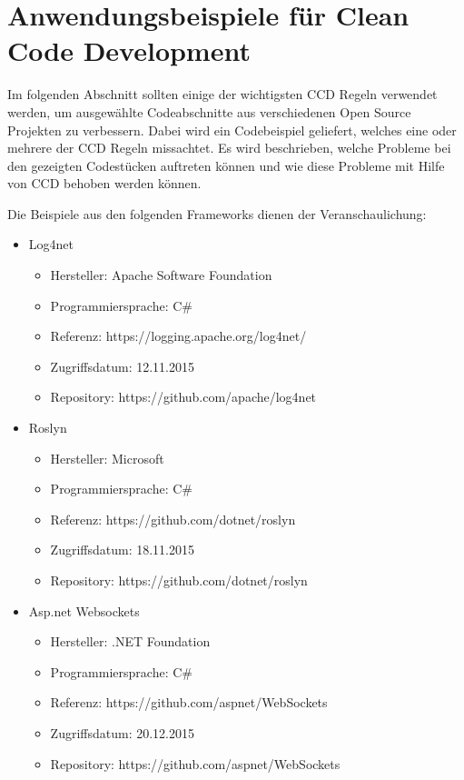 \chapter{Anwendungsbeispiele für Clean Code Development}
\label{cha:Anwendung}

Im folgenden Abschnitt sollten einige der wichtigsten CCD Regeln verwendet werden, um ausgewählte Codeabschnitte aus verschiedenen Open Source Projekten zu verbessern. Dabei wird ein Codebeispiel geliefert, welches eine oder mehrere der CCD Regeln missachtet. Es wird beschrieben, welche Probleme bei den gezeigten Codestücken auftreten können und wie diese Probleme mit Hilfe von CCD behoben werden können.

\SuperPar Die Beispiele aus den folgenden Frameworks dienen der Veranschaulichung:

\begin{itemize}
	\item Log4net 
		\begin{itemize}
			\item Hersteller: Apache Software Foundation
			\item Programmiersprache: C\#
			\item Referenz: https://logging.apache.org/log4net/
			\item Zugriffsdatum: 12.11.2015
			\item Repository: https://github.com/apache/log4net
		\end{itemize}
	\item Roslyn 		
		\begin{itemize}
			\item Hersteller: Microsoft
			\item Programmiersprache: C\#
			\item Referenz: https://github.com/dotnet/roslyn
			\item Zugriffsdatum: 18.11.2015
			\item Repository: https://github.com/dotnet/roslyn
		\end{itemize}
	\item Asp.net Websockets 
		\begin{itemize}
			\item Hersteller: .NET Foundation
			\item Programmiersprache: C\#
			\item Referenz: https://github.com/aspnet/WebSockets
			\item Zugriffsdatum: 20.12.2015
			\item Repository: https://github.com/aspnet/WebSockets

\end{itemize}
\end{itemize}
